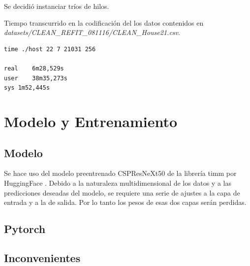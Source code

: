 Se decidió instanciar tríos de hilos. 

Tiempo transcurrido en la codificación del los datos contenidos en \\ \textit{datasets/CLEAN\_REFIT\_081116/CLEAN\_House21.csv}.
\begin{lstlisting}
time ./host 22 7 21031 256

real	6m28,529s
user	38m35,273s
sys	1m52,445s
\end{lstlisting}


\section{Modelo y Entrenamiento}
\subsection{Modelo}
Se hace uso del modelo preentrenado CSPResNeXt50 de la librería timm por HuggingFace \autocite{crunchbase2023huggingface}.
Debido a la naturaleza multidimensional de los datos y a las predicciones deseadas del modelo, se requiere una serie de ajustes a la capa de entrada y a la de salida. Por lo tanto los pesos de esas dos capas serán perdidas.

\todo[]

\subsection{Pytorch}

\subsection{Inconvenientes}
